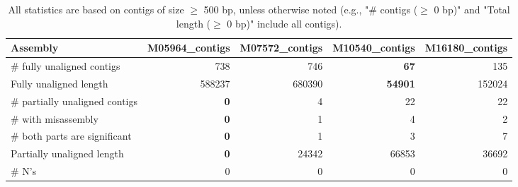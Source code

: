 \documentclass[12pt,a4paper]{article}
\begin{document}
\begin{table}[ht]
\begin{center}
\caption{All statistics are based on contigs of size $\geq$ 500 bp, unless otherwise noted (e.g., "\# contigs ($\geq$ 0 bp)" and "Total length ($\geq$ 0 bp)" include all contigs).}
\begin{tabular}{|l*{4}{|r}|}
\hline
Assembly & M05964\_contigs & M07572\_contigs & M10540\_contigs & M16180\_contigs \\ \hline
\# fully unaligned contigs & 738 & 746 & {\bf 67} & 135 \\ \hline
Fully unaligned length & 588237 & 680390 & {\bf 54901} & 152024 \\ \hline
\# partially unaligned contigs & {\bf 0} & 4 & 22 & 22 \\ \hline
\hspace{5mm}\# with misassembly & {\bf 0} & 1 & 4 & 2 \\ \hline
\hspace{5mm}\# both parts are significant & {\bf 0} & 1 & 3 & 7 \\ \hline
Partially unaligned length & {\bf 0} & 24342 & 66853 & 36692 \\ \hline
\# N's & 0 & 0 & 0 & 0 \\ \hline
\end{tabular}
\end{center}
\end{table}
\end{document}
